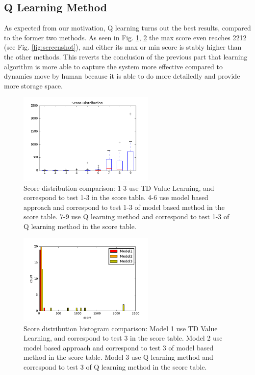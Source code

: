 \documentclass[submit]{harvardml}
\begin{document}
\subsection{Q Learning Method}
As expected from our motivation, Q learning turns out the best results, compared to the former two methods. As seen in Fig. \ref{fig:compare_box}, \ref{fig:compare_bar} the max score even reaches 2212 (see Fig. \ref{fig:screenshot}), and either its max or min score is stably higher than the other methods. This reverts the conclusion of the previous part that learning algorithm is more able to capture the system more effective compared to dynamics move by human because it is able to do more detailedly and provide more storage space.
 
\begin{figure}[htbp]
\centering
\includegraphics[width=0.6\textwidth]{box_comparison.png}
\caption{Score distribution comparison: 1-3 use TD Value Learning, and correspond to test 1-3 in the score table. 4-6 use model based approach and correspond to test 1-3 of model based method in the score table. 7-9 use Q learning method and correspond to test 1-3 of Q learning method in the score table. }
\label{fig:compare_box}
\end{figure}

\begin{figure}[htbp]
\centering
\includegraphics[width=0.6\textwidth]{bar_comparison.pdf}
\caption{Score distribution histogram comparison: Model 1 use TD Value Learning, and correspond to test 3 in the score table. Model 2 use model based approach and correspond to test 3 of model based method in the score table. Model 3 use Q learning method and correspond to test 3 of Q learning method in the score table. }
\label{fig:compare_bar}
\end{figure}
\end{document}

